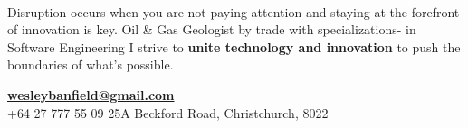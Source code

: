 \documentclass[]{friggeri-cv}
\begin{document}
~
\begin{reduced}
\large	
Disruption occurs when you are not paying attention and staying at the forefront of innovation is key. Oil \& Gas Geologist by trade with specializations- in Software Engineering I strive to \textbf{unite technology and innovation} to push the boundaries of what’s possible.

\centering
\vspace{9pt}
\href{mailto:wesleybanfield@gmail.com}{\textbf{wesleybanfield@gmail.com}}
\\+64 27 777 55 09 25A Beckford Road, Christchurch, 8022
\end{reduced}
\end{document}

